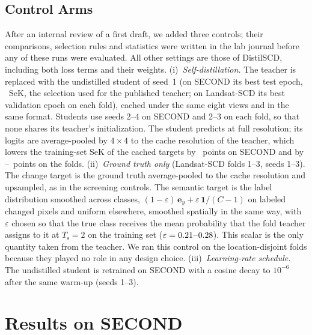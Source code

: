 \documentclass[journal]{IEEEtran}
\begin{document}
\subsection{Control Arms}
\label{sec:control-arms}
After an internal review of a first draft, we added three controls; their comparisons, selection
rules and statistics were written in the lab journal before any of these runs were evaluated. All
other settings are those of DistilSCD, including both loss terms and their weights.
(i)~\emph{Self-distillation.} The teacher is replaced with the undistilled student of seed~1 (on
SECOND its best test epoch, \RevSelfTeacherSec\ SeK, the selection used for the published teacher;
on Landsat-SCD its best validation epoch on each fold), cached under the same eight views and in the
same format. Students use seeds 2--4 on SECOND and 2--3 on each fold, so that none shares its
teacher's initialization. The student predicts at full resolution; its logits are average-pooled
by $4\times4$ to the cache resolution of the teacher, which lowers the training-set SeK of the
cached targets by \RevCacheSecDrop\ points on SECOND and by \RevCacheLanDropMin--\RevCacheLanDropMax\
points on the folds.
(ii)~\emph{Ground truth only} (Landsat-SCD folds 1--3, seeds 1--3). The change target is the ground
truth average-pooled to the cache resolution and upsampled, as in the screening controls. The
semantic target is the label distribution smoothed across classes,
$(1-\varepsilon)\,\mathbf{e}_y+\varepsilon\,\mathbf{1}/(C-1)$ on labeled changed pixels and uniform elsewhere,
smoothed spatially in the same way, with $\varepsilon$ chosen so that the true class receives the
mean probability that the fold teacher assigns to it at $T_{\mathrm{s}}=2$ on the training set
($\varepsilon=0.21$--$0.28$). This scalar is the only quantity taken from the teacher.
We ran this control on the location-disjoint folds because they played no role in any design choice.
(iii)~\emph{Learning-rate schedule.} The undistilled student is retrained on SECOND with a cosine
decay to $10^{-6}$ after the same warm-up (seeds 1--3).

\section{Results on SECOND}
\label{sec:second}
\end{document}

